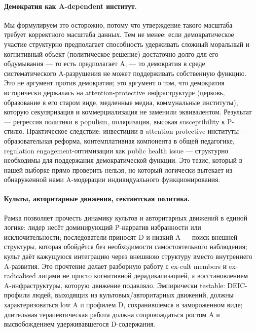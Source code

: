 \paragraph{Демократия как A-dependent институт.} Мы формулируем это осторожно, потому что утверждение такого масштаба требует корректного масштаба данных. Тем не менее: если демократическое участие структурно предполагает способность удерживать сложный моральный и когнитивный объект (политическое решение) достаточно долго для его обдумывания --- то есть предполагает A, --- то демократия в среде систематического A-разрушения не может поддерживать собственную функцию. Это не аргумент против демократии; это аргумент о том, что демократия исторически держалась на attention-protective инфраструктуре (церковь, образование в его старом виде, медленные медиа, коммунальные институты), которую секуляризация и коммерциализация не заменили эквивалентом. Результат --- регрессия политики в populism, поляризация, высокая susceptibility к P-стилю. Практическое следствие: инвестиции в attention-protective институты --- образовательная реформа, контемплативная компонента в общей педагогике, regulation engagement-оптимизации как public health issue --- структурно необходимы для поддержания демократической функции. Это тезис, который в нашей выборке прямо проверить нельзя, но который логически вытекает из обнаруженной нами A-модерации индивидуального функционирования.

\paragraph{Культы, авторитарные движения, сектантская политика.} Рамка позволяет прочесть динамику культов и авторитарных движений в единой логике: лидер несёт доминирующий P-нарратив избранности или исключительности; последователи приносят D и низкий A --- поиск внешней структуры, которая обойдётся без необходимости самостоятельного наблюдения; культ даёт кажущуюся интеграцию через внешнюю структуру вместо внутреннего A-развития. Это прочтение делает разборную работу с ex-cult members и ex-radicalised лицами не просто когнитивной дерадикализацией, а восстановлением A-инфраструктуры, которую движение подавляло. Эмпирически testable: DEIC-профили людей, выходящих из культовых/авторитарных движений, должны характеризоваться low A и профилем D, сохранившемся в замороженном виде; длительная терапевтическая работа должна сопровождаться ростом A и высвобождением удерживавшегося D-содержания.

